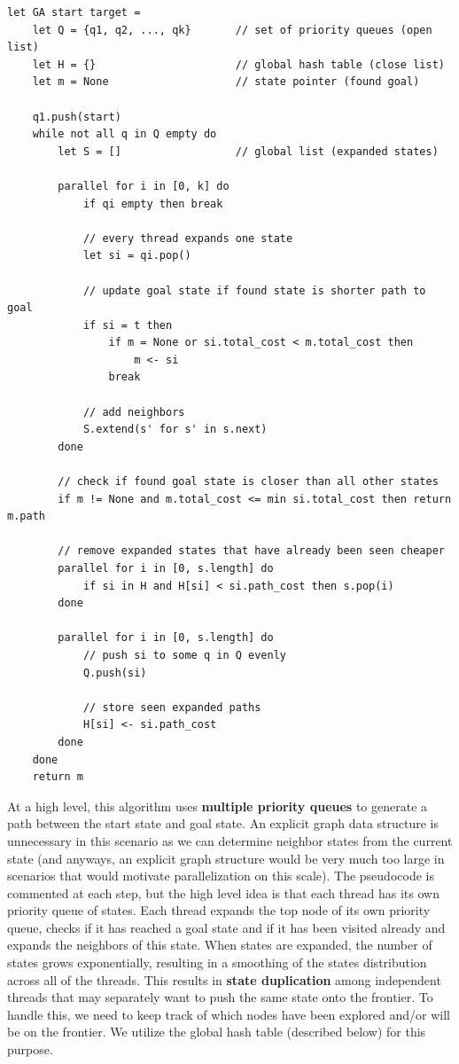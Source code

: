\begin{verbatim}
let GA start target =
    let Q = {q1, q2, ..., qk}       // set of priority queues (open list)
    let H = {}                      // global hash table (close list)
    let m = None                    // state pointer (found goal)
    
    q1.push(start)
    while not all q in Q empty do
        let S = []                  // global list (expanded states)
        
        parallel for i in [0, k] do
            if qi empty then break
            
            // every thread expands one state
            let si = qi.pop()
            
            // update goal state if found state is shorter path to goal
            if si = t then
                if m = None or si.total_cost < m.total_cost then
                    m <- si
                break
            
            // add neighbors
            S.extend(s' for s' in s.next)
        done
        
        // check if found goal state is closer than all other states
        if m != None and m.total_cost <= min si.total_cost then return m.path
        
        // remove expanded states that have already been seen cheaper
        parallel for i in [0, s.length] do
            if si in H and H[si] < si.path_cost then s.pop(i)
        done
        
        parallel for i in [0, s.length] do
            // push si to some q in Q evenly
            Q.push(si)
            
            // store seen expanded paths
            H[si] <- si.path_cost
        done
    done
    return m

\end{verbatim}
At a high level, this algorithm uses \textbf{multiple priority queues} to generate a path between the start state and goal state. An explicit graph data structure is unnecessary in this scenario as we can determine neighbor states from the current state (and anyways, an explicit graph structure would be very much too large in scenarios that would motivate parallelization on this scale).\newline\newline
The pseudocode is commented at each step, but the high level idea is that each thread has its own priority queue of states. Each thread expands the top node of its own priority queue, checks if it has reached a goal state and if it has been visited already and expands the neighbors of this state.\newline\newline
When states are expanded, the number of states grows exponentially, resulting in a smoothing of the states distribution across all of the threads. This results in \textbf{state duplication} among independent threads that may separately want to push the same state onto the frontier. To handle this, we need to keep track of which nodes have been explored and/or will be on the frontier. We utilize the global hash table (described below) for this purpose.

